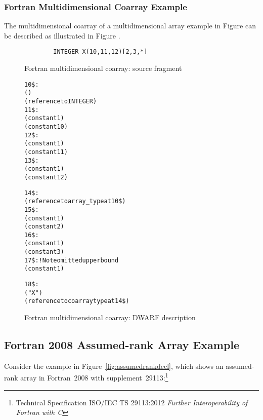 \subsubsection{Fortran Multidimensional Coarray Example}
The  multidimensional coarray of a multidimensional array example
in Figure  can be described as 
illustrated in Figure .

\begin{figure}[h]
\begin{lstlisting}
        INTEGER X(10,11,12)[2,3,*]
\end{lstlisting}
\caption{Fortran multidimensional coarray: source fragment}
\label{fig:Fortranmultidimensionalcoarraysourcefragment}
\end{figure}

\begin{figure}[h]
\begin{dwflisting}
\begin{alltt}
10\$: \DWTAGarraytype
        \DWATordering(\DWORDcolmajor)
        \DWATtype(reference to INTEGER)
11\$:    \DWTAGsubrangetype
            \DWATlowerbound(constant 1)
            \DWATupperbound(constant 10)
12\$:    \DWTAGsubrangetype
            \DWATlowerbound(constant  1)
            \DWATupperbound(constant 11)
13\$:    \DWTAGsubrangetype
            \DWATlowerbound(constant  1)
            \DWATupperbound(constant 12)

14\$: \DWTAGcoarraytype
        \DWATtype(reference to array_type at 10\$)
15\$:    \DWTAGsubrangetype
            \DWATlowerbound(constant 1)
            \DWATupperbound(constant 2)
16\$:    \DWTAGsubrangetype
            \DWATlowerbound(constant 1)
            \DWATupperbound(constant 3)
17\$:    \DWTAGsubrangetype                ! Note omitted upper bound
            \DWATlowerbound(constant 1)

18\$: \DWTAGvariable
        \DWATname("X")
        \DWATtype(reference to coarray type at 14\$)
\end{alltt}
\end{dwflisting}
\caption{Fortran multidimensional coarray: DWARF description}
\label{fig:FortranmultidimensionalcoarrayDWARFdescription}
\end{figure}


\clearpage
\subsection{Fortran 2008 Assumed-rank Array Example}
\label{app:assumedrankexample}
Consider the example in Figure~\ref{fig:assumedrankdecl}, which shows
an assumed-rank array in Fortran~2008 with
supplement~29113:\footnote{Technical Specification ISO/IEC TS
  29113:2012 \emph{Further Interoperability of Fortran with C}}

